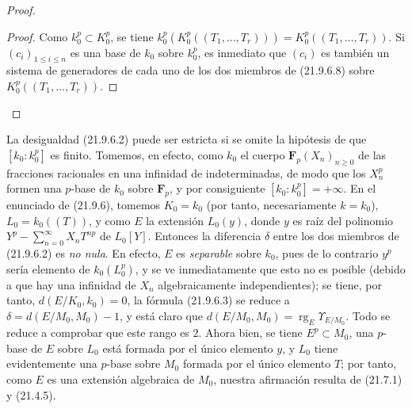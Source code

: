 \begin{proof}
\begin{enumerate}
  \begin{proof}
  Como $k_0^p\subset K_0^p$, se tiene
  $k_0^p(K_0^p((T_1,\ldots,T_r)))=K_0^p((T_1,\ldots,T_r))$.
  Si $(c_i)_{1\leqslant i\leqslant n}$ es una base de $k_0$ sobre $k_0^p$,
  es inmediato que $(c_i)$ es también un sistema de generadores de cada uno
  de los dos miembros de (21.9.6.8) sobre
  $K_0^p((T_1,\ldots,T_r))$.
  \end{proof}
\end{enumerate}
\end{proof}

\begin{remark}[21.9.7]
\label{0.21.9.7-fr}
La desigualdad (21.9.6.2) puede ser estricta si se omite la hipótesis de que
$[k_0:k_0^p]$ es finito. Tomemos, en efecto, como $k_0$ el cuerpo
$\mathbf F_p(X_n)_{n\geqslant0}$ de las fracciones racionales en una infinidad
de indeterminadas, de modo que los $X_n^p$ formen una $p$-base de $k_0$ sobre
$\mathbf F_p$, y por consiguiente $[k_0:k_0^p]=+\infty$. En el enunciado de
(21.9.6), tomemos $K_0=k_0$ (por tanto, necesariamente $k=k_0$),
$L_0=k_0((T))$, y como $E$ la extensión $L_0(y)$, donde $y$ es raíz del
polinomio
$Y^p-\sum_{n=0}^{\infty}X_nT^{np}$
de $L_0[Y]$. Entonces la diferencia $\delta$ entre los dos miembros de
(21.9.6.2) es \emph{no nula}. En efecto, $E$ es \emph{separable} sobre $k_0$,
pues de lo contrario $y^p$ sería elemento de $k_0(L_0^p)$, y se ve
inmediatamente que esto no es posible (debido a que hay una infinidad de
$X_n$ algebraicamente independientes); se tiene, por tanto,
$d(E/K_0,k_0)=0$, la fórmula (21.9.6.3) se reduce a
$\delta=d(E/M_0,M_0)-1$, y está claro que
$d(E/M_0,M_0)=\operatorname{rg}_E\Upsilon_{E/M_0}$. Todo se reduce a comprobar
que este rango es $2$. Ahora bien, se tiene $E^p\subset M_0$, una $p$-base de
$E$ sobre $L_0$ está formada por el único elemento $y$, y $L_0$ tiene
evidentemente una $p$-base sobre $M_0$ formada por el único elemento $T$; por
tanto, como $E$ es una extensión algebraica de $M_0$, nuestra afirmación
resulta de (21.7.1) y (21.4.5).
\end{remark}

